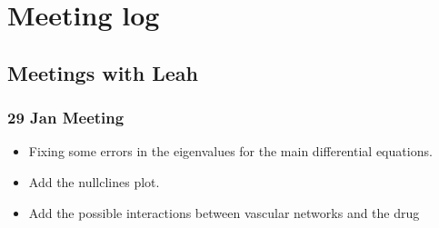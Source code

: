 \chapter{Meeting log}
\section{Meetings with Leah}
\subsection{29 Jan Meeting}

\begin{itemize}[itemsep=0pt, parsep=0pt]
	\item Fixing some errors in the eigenvalues for the main differential equations. 
	\item Add the nullclines plot.
	\item Add the possible interactions between vascular networks and the drug
\end{itemize}



